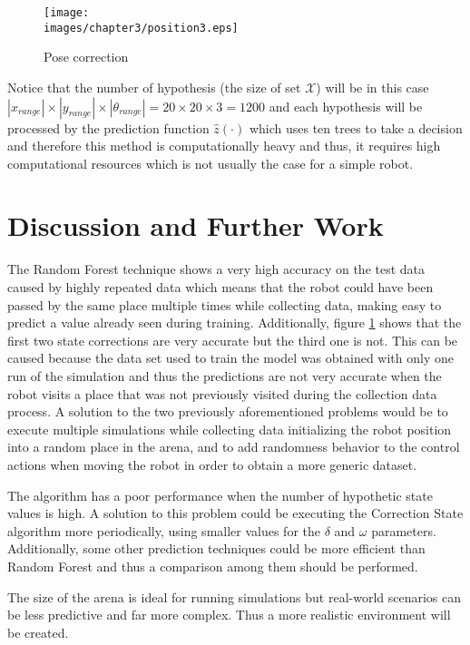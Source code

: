 \begin{figure}[h!]
  \centering
  \texttt{[image: \\images/chapter3/position3.eps]}
  \caption{Pose correction}
  \label{fig:ch-3:pose-correction}
\end{figure}

Notice that the number of hypothesis (the size of set $\mathcal{X}$) will be in this case $|x_{range}|\times|y_{range}|\times|\theta_{range}| = 20\times20\times3 = 1200$ and each hypothesis will be processed by the prediction function $\hat z(\mathbf{\cdot})$ which uses ten trees to take a decision and therefore this method is computationally heavy and thus, it requires high computational resources which is not usually the case for a simple robot. 

\section{Discussion and Further Work}

The Random Forest technique shows a very high accuracy on the test data caused by highly repeated data which means that the robot could have been passed by the same place multiple times while collecting data, making easy to predict a value already seen during training. Additionally, figure \ref{fig:ch-3:pose-correction} shows that the first two state corrections are very accurate but the third one is not. This can be caused because the data set used to train the model was obtained with only one run of the simulation and thus the predictions are not very accurate when the robot visits a place that was not previously visited during the collection data process. A solution to the two previously aforementioned problems would be to execute multiple simulations while collecting data initializing the robot position into a random place in the arena, and to add randomness behavior to the control actions when moving the robot in order to obtain a more generic dataset.

The algorithm has a poor performance when the number of hypothetic state values is high. A solution to this problem could be executing the Correction State algorithm more periodically, using smaller values for the $\delta$ and $\omega$ parameters. Additionally, some other prediction techniques could be more efficient than Random Forest and thus a comparison among them should be performed.

The size of the arena is ideal for running simulations but real-world scenarios can be less predictive and far more complex. Thus a more realistic environment will be created.






